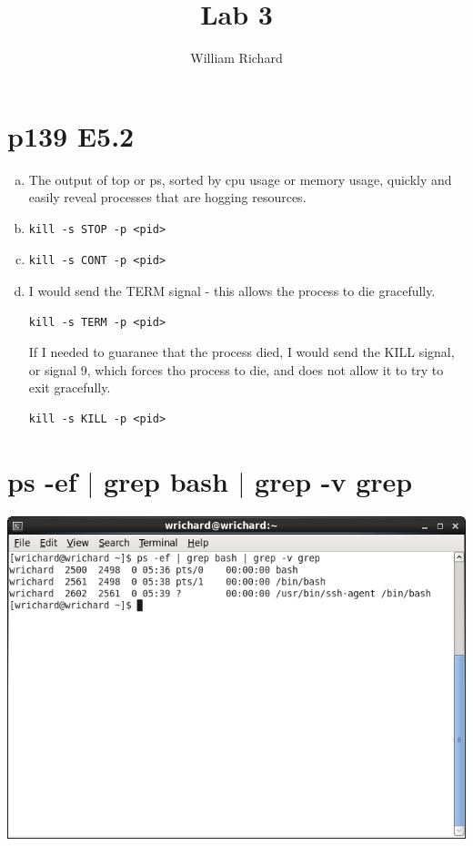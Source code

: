 \documentclass[a4paper,10pt]{article}
\title{Lab 3}
\author{William Richard}
\begin{document}
\maketitle

\section{p139 E5.2}
\begin{enumerate}[(a)]
  \item The output of top or ps, sorted by cpu usage or memory usage, quickly and easily reveal processes that are hogging resources.
  \item 
\begin{verbatim}
kill -s STOP -p <pid>
\end{verbatim}
  \item 
\begin{verbatim}
kill -s CONT -p <pid>
\end{verbatim}
  \item I would send the TERM signal - this allows the process to die gracefully.
\begin{verbatim}
kill -s TERM -p <pid>
\end{verbatim}
If I needed to guaranee that the process died, I would send the KILL signal, or signal 9, which forces tho process to die, and does not allow it to try to exit gracefully.
\begin{verbatim}
kill -s KILL -p <pid>
\end{verbatim}
\end{enumerate}

\section{ps -ef $|$ grep bash $|$ grep -v grep}
  \begin{center}
  \includegraphics[width=\linewidth]{./grepbash.png}
  \end{center}
\end{document}
